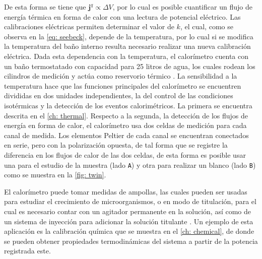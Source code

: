 	De esta forma se tiene que $\mathbf{j}^q \propto \Delta V$, por lo cual es posible cuantificar un flujo de energ\'ia t\'ermica en forma de calor con una lectura de potencial el\'ectrico. Las calibraciones el\'ectricas permiten determinar el valor de $k$, el cual, como se observa en la \autoref{eq: seebeck}, depende de la temperatura, por lo cual si se modifica la temperatura del ba\~no interno resulta necesario realizar una nueva calibraci\'on el\'ectrica. Dada esta dependencia con la temperatura, el calor\'imetro cuenta con un ba\~no termostatado con capacidad para 25 litros de agua, los cuales rodean los cilindros de medici\'on y act\'ua como reservorio t\'ermico \cite{Suurkuusk}. La sensibilidad a la temperatura hace que las funciones principales del calor\'imetro se encuentren divididas en dos unidades independientes, la del control de las condiciones isot\'ermicas y la detecci\'on de los eventos calorim\'etricos. La primera se encuentra descrita en el \autoref{ch: thermal}. Respecto a la segunda, la detecci\'on de los flujos de energ\'ia en forma de calor, el calor\'imetro usa dos celdas de medici\'on para cada canal de medida. Los elementos Peltier de cada canal se encuentran conectados en serie, pero con la polarizaci\'on opuesta, de tal forma que se registre la diferencia en los flujos de calor de las dos celdas, de esta forma es posible usar una para el estudio de la muestra (lado \texttt{A}) y otra para realizar un blanco (lado \texttt{B}) como se muestra en la \autoref{fig: twin}.
	 
	El calor\'imetro puede tomar medidas de ampollas, las cuales pueden ser usadas para estudiar el crecimiento de microorganismos, o en modo de titulaci\'on, para el cual es necesario contar con un agitador permanente en la soluci\'on, as\'i como de un sistema de inyecci\'on para adicionar la soluci\'on titulante \cite{Suurkuusk}. Un ejemplo de esta aplicaci\'on es la calibraci\'on qu\'imica que se muestra en el \autoref{ch: chemical}, de donde se pueden obtener propiedades termodin\'amicas del sistema a partir de la potencia registrada este. 	 

